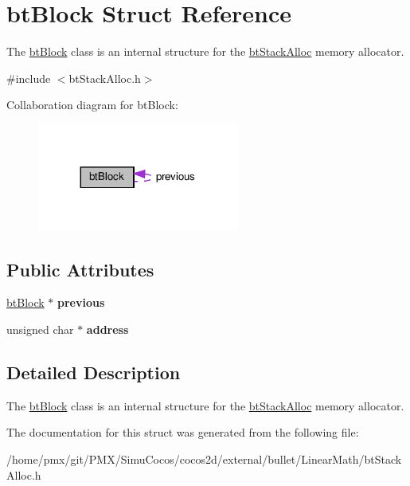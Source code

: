 \hypertarget{structbtBlock}{}\section{bt\+Block Struct Reference}
\label{structbtBlock}


The \hyperlink{structbtBlock}{bt\+Block} class is an internal structure for the \hyperlink{classbtStackAlloc}{bt\+Stack\+Alloc} memory allocator.  




{\ttfamily \#include $<$bt\+Stack\+Alloc.\+h$>$}



Collaboration diagram for bt\+Block\+:
\nopagebreak
\begin{figure}[H]
\begin{center}
\leavevmode
\includegraphics[width=188pt]{structbtBlock__coll__graph}
\end{center}
\end{figure}
\subsection*{Public Attributes}
\begin{DoxyCompactItemize}
\item 
\mbox{\label{structbtBlock_a9f26373f0b3759d114d46c7775ffacdc}} 
\hyperlink{structbtBlock}{bt\+Block} $\ast$ {\bfseries previous}
\item 
\mbox{\label{structbtBlock_a32c3a66e34b4a2fd2312f9ccdeffcfce}} 
unsigned char $\ast$ {\bfseries address}
\end{DoxyCompactItemize}


\subsection{Detailed Description}
The \hyperlink{structbtBlock}{bt\+Block} class is an internal structure for the \hyperlink{classbtStackAlloc}{bt\+Stack\+Alloc} memory allocator. 

The documentation for this struct was generated from the following file\+:\begin{DoxyCompactItemize}
\item 
/home/pmx/git/\+P\+M\+X/\+Simu\+Cocos/cocos2d/external/bullet/\+Linear\+Math/bt\+Stack\+Alloc.\+h\end{DoxyCompactItemize}
